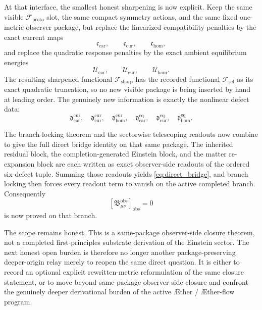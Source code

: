 \documentclass[11pt]{article}
\newcommand{\Aether}{\AE{}ther}
\newcommand{\Aflow}{\AE{}ther-flow}
\newcommand{\ObsBurden}{\mathfrak B_{\mu\nu}^{\mathrm{obs}}}
\newcommand{\ObserverClass}[1]{\left[#1\right]_{\mathrm{obs}}}
\newcommand{\ProtoFunctional}{\mathscr F_{\mathrm{proto}}}
\newcommand{\StemFunctional}{\mathscr F_{\mathrm{sel}}}
\newcommand{\SharpFunctional}{\mathscr F_{\mathrm{sharp}}}
\newcommand{\TensorCurrent}{\mathfrak c_{\mathrm{car}}}
\newcommand{\CurCurrent}{\mathfrak c_{\mathrm{cur}}}
\newcommand{\HomCurrent}{\mathfrak c_{\mathrm{hom}}}
\newcommand{\TensorAmbientEnergy}{\mathcal U_{\mathrm{car}}}
\newcommand{\CurAmbientEnergy}{\mathcal U_{\mathrm{cur}}}
\newcommand{\HomAmbientEnergy}{\mathcal U_{\mathrm{hom}}}
\begin{document}
At that interface, the smallest honest sharpening is now explicit. Keep the same visible \(\ProtoFunctional\) slot, the same compact symmetry actions, and the same fixed one-metric observer package, but replace the linearized compatibility penalties by the exact current maps
\[
\TensorCurrent,\qquad
\CurCurrent,\qquad
\HomCurrent,
\]
and replace the quadratic response penalties by the exact ambient equilibrium energies
\[
\TensorAmbientEnergy,\qquad
\CurAmbientEnergy,\qquad
\HomAmbientEnergy.
\]
The resulting sharpened functional \(\SharpFunctional\) has the recorded functional \(\StemFunctional\) as its exact quadratic truncation, so no new visible package is being inserted by hand at leading order. The genuinely new information is exactly the nonlinear defect data:
\[
\mathfrak d_{\mathrm{car}}^{\mathrm{cur}},\quad
\mathfrak d_{\mathrm{cur}}^{\mathrm{cur}},\quad
\mathfrak d_{\mathrm{hom}}^{\mathrm{cur}},\quad
\mathfrak d_{\mathrm{car}}^{\mathrm{eq}},\quad
\mathfrak d_{\mathrm{cur}}^{\mathrm{eq}},\quad
\mathfrak d_{\mathrm{hom}}^{\mathrm{eq}}.
\]

The branch-locking theorem and the sectorwise telescoping readouts now combine to give the full direct bridge identity on that same package. The inherited residual block, the completion-generated Einstein block, and the matter re-expansion block are each written as exact observer-side readouts of the ordered six-defect tuple. Summing those readouts yields \eqref{eq:direct_bridge}, and branch locking then forces every readout term to vanish on the active completed branch. Consequently
\[
\ObserverClass{\ObsBurden}=0
\]
is now proved on that branch.

The scope remains honest. This is a same-package observer-side closure theorem, not a completed first-principles substrate derivation of the Einstein sector. The next honest open burden is therefore no longer another package-preserving deeper-origin relay merely to reopen the same direct question. It is either to record an optional explicit rewritten-metric reformulation of the same closure statement, or to move beyond same-package observer-side closure and confront the genuinely deeper derivational burden of the active \Aether{} / \Aflow{} program.
\end{document}
